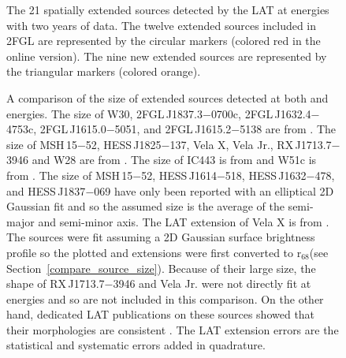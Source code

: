 \documentclass[12pt,preprint]{aastex}
\newif\ifcolorfigure
\newcommand{\gev}{\text{GeV}\xspace}
\newcommand{\tev}{\text{TeV}\xspace}
\newcommand{\rsixeight}{{\ensuremath{\text{r}_{68}}}\xspace}
\begin{document}
\clearpage
  \begin{figure}
      \ifcolorfigure
      \plotone{summary_plots/allsky_extended_sources_color.eps}
      \else
      \fi
      \caption{The 21
      spatially extended sources detected by the LAT
      at \gev energies 
      with two years of data.  The twelve extended sources included in
      2FGL are represented by the circular markers (colored red in the online
      version).  The nine new extended sources are represented by
      the triangular markers (colored orange).}
\label{allsky_extended_sources}
  \end{figure}


\clearpage
\begin{figure}
    \ifcolorfigure
      \plotone{summary_plots/gev_vs_tev_plot_color.eps}
    \else
      \fi
    \caption{
    A comparison of the size of extended sources detected at
    both \gev and \tev energies.  The \tev size of W30,
    2FGL\,J1837.3$-$0700c, 2FGL\,J1632.4$-$4753c, 2FGL\,J1615.0$-$5051,
    and 2FGL\,J1615.2$-$5138 are from \cite{hess_plane_survey}.
    The \tev size of MSH\,15$-$52, HESS\,J1825$-$137,
    Vela X, Vela Jr., RX\,J1713.7$-$3946 and W28 are from
    \cite{msh_15_52_hess,hess_j1825_hess,vela_x_hess,vela_jr_hess,rx_j1713_hess,w28_hess}.
    The \tev size of IC443 is from \cite{ic443_veritas} and
    W51c is from \cite{w51c_with_magic_at_fermi_symposium}.  The \tev
    size of MSH\,15$-$52, HESS\,J1614$-$518, HESS\,J1632$-$478, and
    HESS\,J1837$-$069 have only been reported with an elliptical 2D
    Gaussian fit and so the assumed size is the average of the semi-major
    and semi-minor axis.
    The LAT extension of
    Vela X is from \cite{velax}. 
    The \tev sources were fit assuming a 2D Gaussian surface brightness profile
    so the plotted \gev and \tev extensions were first converted to
    \rsixeight (see Section~\ref{compare_source_size}).  
    Because of
    their large size, the shape of RX\,J1713.7$-$3946 and Vela Jr.
    were not directly fit at \tev energies and so are not included
    in this comparison. On the other hand, dedicated LAT publications on
    these sources showed that their morphologies are consistent
    \citep{rx_j1713_lat,vela_jr_lat}.
    The LAT
    extension errors are the statistical and systematic errors added
    in quadrature. 
}\label{gev_vs_tev_plot}
  \end{figure}
\end{document}
